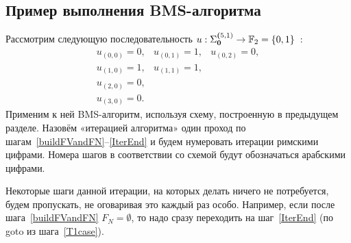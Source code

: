 \documentclass[14pt]{extarticle}
\begin{document}
\subsection{Пример выполнения BMS-алгоритма}

Рассмотрим следующую последовательность $u: \Sigma_{\boldsymbol{0}}^{\boldsymbol{(}5,1)} \to \mathbb
F_2=\{0,1\}$~\cite{Sakata88}:
$$\begin{matrix}
u_{(0,0)}=0, & u_{(0,1)}=1, & u_{(0,2)}=0,\\
u_{(1,0)}=1, & u_{(1,1)}=1,\\
u_{(2,0)}=0,\\
u_{(3,0)}=0.
\end{matrix}$$
Применим к ней BMS-алгоритм, используя схему, построенную в предыдущем разделе.
Назовём «итерацией алгоритма» один проход по
шагам~\ref{buildFVandFN}–\ref{IterEnd} и будем нумеровать итерации римскими
цифрами. Номера шагов в соответствии со схемой будут обозначаться арабскими
цифрами.

Некоторые шаги данной итерации, на которых делать
ничего не потребуется, будем пропускать, не оговаривая это каждый раз особо. Например, если после шага~\ref{buildFVandFN} $F_N=\emptyset$, то надо сразу переходить на шаг~\ref{IterEnd} (по goto из шага~\ref{T1case}).
\end{document}
